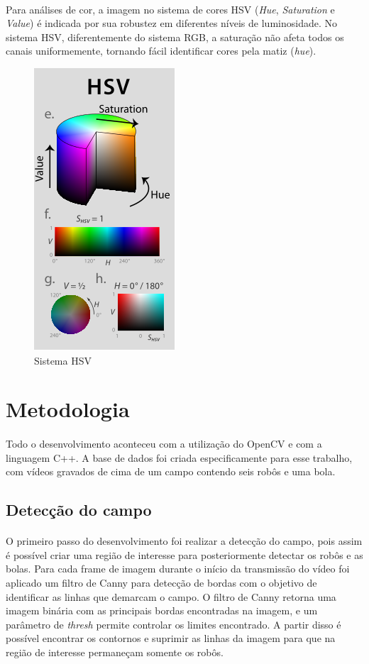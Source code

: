 \documentclass[conference, harvard, brazil, english]{sbatex}
\begin{document}
		\paragraph{}
		Para análises de cor, a imagem no sistema de cores HSV (\textit{Hue}, \textit{Saturation} e \textit{Value}) é indicada por sua robustez em diferentes níveis de luminosidade. No sistema HSV, diferentemente do sistema RGB, a saturação não afeta todos os canais uniformemente, tornando fácil identificar cores pela matiz (\textit{hue}).
		\begin{figure}[h]
			\centering
			\includegraphics[scale=0.63]{hsv-2}
			\caption{Sistema HSV}
		\end{figure}
	
	\section{Metodologia}
		\paragraph{}
		Todo o desenvolvimento aconteceu com a utilização do OpenCV e com a linguagem C++. A base de dados foi criada especificamente para esse trabalho, com vídeos gravados de cima de um campo contendo seis robôs e uma bola.
		\subsection{Detecção do campo}
		\paragraph{}
		O primeiro passo do desenvolvimento foi realizar a detecção do campo, pois assim é possível criar uma região de interesse para posteriormente detectar os robôs e as bolas. Para cada frame de imagem durante o início da transmissão do vídeo foi aplicado um filtro de Canny para detecção de bordas com o objetivo de identificar as linhas que demarcam o campo. O filtro de Canny retorna uma imagem binária com as principais bordas encontradas na imagem, e um parâmetro de \textit{thresh} permite controlar os limites encontrado. A partir disso é possível encontrar os contornos e suprimir as linhas da imagem para que na região de interesse permaneçam somente os robôs. 
\end{document}
